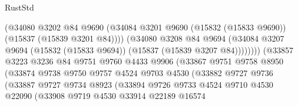 \begin{lexlean}{RustStd}
\begin{coremodule}
                                      (@34080
                                        @3202
                                        @84
                                        @9690
                                        (@34084
                                          @3201
                                          @9690
                                          (@15832 (@15833 @9690))
                                          (@15837 (@15839 @3201 @84))))
                                      (@34080
                                        @3208
                                        @84
                                        @9694
                                        (@34084
                                          @3207
                                          @9694
                                          (@15832 (@15833 @9694))
                                          (@15837 (@15839 @3207 @84))))))))
                              (@33857
                                @3223
                                @3236
                                @84
                                @9751
                                @9760
                                @4433
                                @9906
                                (@33867
                                  @9751
                                  @9758
                                  @8950
                                  (@33874
                                    @9738
                                    @9750
                                    @9757
                                    @4524
                                    @9703
                                    @4530
                                    (@33882
                                      @9727
                                      @9736
                                      (@33887
                                        @9727
                                        @9734
                                        @8923
                                        (@33894
                                          @9726
                                          @9733
                                          @4524
                                          @9710
                                          @4530
                                          @22090
                                          (@33908
                                            @9719
                                            @4530
                                            @33914
                                            @22189
                                            @16574

\end{coremodule}
\end{lexlean}
